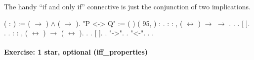 \documentclass[12pt]{report}
\begin{document}
 The handy ``if and only if'' connective is just the conjunction of
    two implications. \begin{coqdoccode}
\coqdocemptyline
\coqdocnoindent
{}  (  : ) := ( \ensuremath{\rightarrow} ) \ensuremath{\land} ( \ensuremath{\rightarrow} ).\coqdoceol
\coqdocemptyline
\coqdocnoindent
{} "P <-> Q" := (  ) \coqdoceol
\coqdocindent{11.00em}
(  95,  ) \coqdoceol
\coqdocindent{11.00em}
: .\coqdoceol
\coqdocemptyline
\coqdocnoindent
{}  : \coqdockw{\ensuremath{\forall}}   : , \coqdoceol
\coqdocindent{1.00em}
( \ensuremath{\leftrightarrow} ) \ensuremath{\rightarrow}  \ensuremath{\rightarrow} .\coqdoceol
\coqdocnoindent
{}.\coqdoceol
\coqdocindent{1.00em}
   .\coqdoceol
\coqdocindent{1.00em}
   [ ].  . .\coqdoceol
\coqdocemptyline
\coqdocnoindent
{}  : \coqdockw{\ensuremath{\forall}}   : , \coqdoceol
\coqdocindent{1.00em}
( \ensuremath{\leftrightarrow} ) \ensuremath{\rightarrow} ( \ensuremath{\leftrightarrow} ).\coqdoceol
\coqdocnoindent
{}.\coqdoceol
\coqdocindent{1.00em}
   .\coqdoceol
\coqdocindent{1.00em}
   [ ].\coqdoceol
\coqdocindent{1.00em}
.\coqdoceol
\coqdocindent{2.00em}
 "->".  .\coqdoceol
\coqdocindent{2.00em}
 "<-".  . .\coqdoceol
\coqdocemptyline
\end{coqdoccode}
\paragraph{Exercise: 1 star, optional (iff\_properties)}
\end{document}
